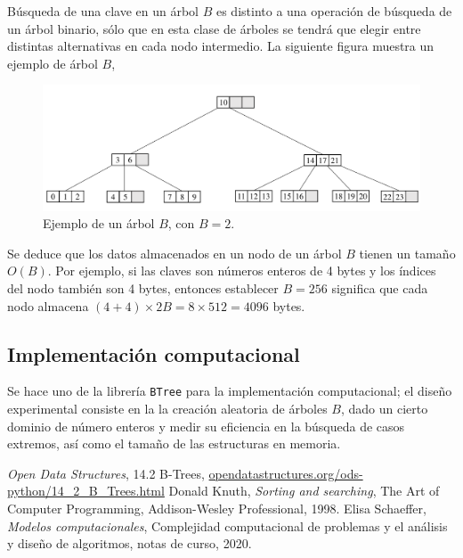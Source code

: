 \documentclass[letterpaper,11pt]{article}
\begin{document}
Búsqueda de una clave en un árbol $B$ es distinto a una operación de búsqueda de un árbol binario, sólo que en esta clase de árboles se tendrá que elegir entre distintas alternativas en cada nodo intermedio. La siguiente figura muestra un ejemplo de árbol $B$,

\begin{figure}[h!]
  \centering
  \includegraphics[width=\textwidth]{img/btree.pdf}
  \caption{Ejemplo de un árbol $B$, con $B=2$.}
  \label{fig:ie}
\end{figure}

Se deduce que los datos almacenados en un nodo de un árbol $B$ tienen un tamaño $O(B)$. Por ejemplo, si las claves son números enteros de 4 bytes y los índices del nodo también son 4 bytes, entonces establecer $ B=256 $ significa que cada nodo almacena $\displaystyle (4+4)\times 2B= 8\times512=4096$ bytes.

\subsection{Implementación computacional}

Se hace uno de la librería \texttt{BTree} para la implementación computacional; el diseño experimental consiste en la la creación aleatoria de árboles $B$, dado un cierto dominio de número enteros y medir su eficiencia en la búsqueda de casos extremos, así como el tamaño de las estructuras en memoria.
 

\begin{thebibliography}{0}
  \textit{Open Data Structures}, 14.2 B-Trees, \url{opendatastructures.org/ods-python/14_2_B_Trees.html}
   Donald Knuth, \textit{Sorting and searching}, The Art of Computer Programming, Addison-Wesley Professional, 1998.
   Elisa Schaeffer, \textit{Modelos computacionales}, Complejidad computacional de problemas y el análisis y diseño de algoritmos, notas de curso, 2020.
\end{thebibliography}
\end{document}
